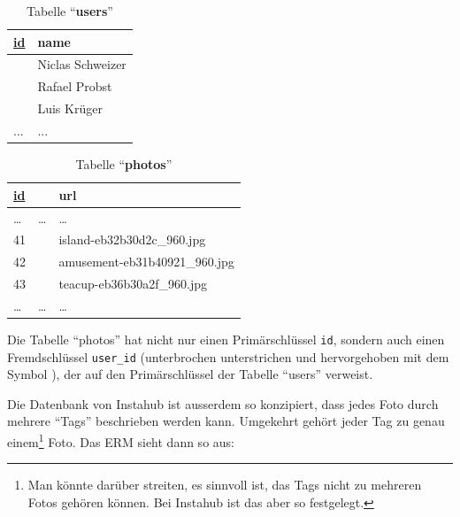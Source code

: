 \begin{minipage}{.38\textwidth}
\centering

\begin{table}[H]
\centering
\begin{tabular}{a|l}
   \underline{id} & name    \\\midrule
{}  & Niclas Schweizer    \\
  & Rafael Probst   \\
  & Luis Krüger  \\
... & ...
\end{tabular}
\caption{Tabelle ``\textbf{users}''}
\label{table:users-2}
\end{table}
\end{minipage}
\begin{minipage}{.58\textwidth}
\centering
\begin{table}[H]
\centering
\begin{tabular}{a|l|l}
   \underline{id} & & url \\\midrule
  \dots & \dots & \dots \\
41 &    & island-eb32b30d2c\_960.jpg   \\
42&    & amusement-eb31b40921\_960.jpg    \\
43&     & teacup-eb36b30a2f\_960.jpg  \\
\dots & \dots& \dots
\end{tabular}
\caption{Tabelle ``\textbf{photos}''}
\label{table:photos-2}
\end{table}
\end{minipage}

Die Tabelle ``photos'' hat nicht nur einen Primärschlüssel \texttt{id}, sondern auch einen Fremdschlüssel \texttt{user\_id} (unterbrochen unterstrichen und hervorgehoben mit dem Symbol \faKey), der auf den Primärschlüssel der Tabelle ``users'' verweist. 

Die Datenbank von Instahub ist ausserdem so konzipiert, dass jedes Foto durch mehrere \enquote{Tags} beschrieben werden kann. Umgekehrt gehört jeder Tag zu genau einem\footnote{Man könnte darüber streiten, es sinnvoll ist, das Tags nicht zu mehreren Fotos gehören können. Bei Instahub ist das aber so festgelegt.} Foto. Das ERM sieht dann so aus:

